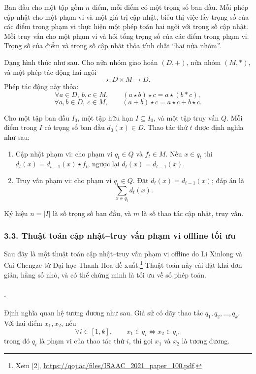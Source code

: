 \documentclass[11pt]{article}
\begin{document}
Ban đầu cho một tập gồm \(n\) điểm, mỗi điểm có một trọng số ban đầu. Mỗi phép
cập nhật cho một phạm vi và một giá trị cập nhật, biểu thị việc lấy trọng số
của các điểm trong phạm vi thực hiện một phép toán hai ngôi với trọng số cập
nhật. Mỗi truy vấn cho một phạm vi và hỏi tổng trọng số của các điểm trong phạm
vi. Trọng số của điểm và trọng số cập nhật thỏa tính chất ``hai nửa nhóm''.

Dạng hình thức như sau. Cho nửa nhóm giao hoán \((D,+)\), nửa nhóm \((M,*)\),
và một phép tác động hai ngôi
\[
  \star:D\times M\to D.
\]
Phép tác động này thỏa:
\[
  \forall a\in D,\ b,c\in M,\qquad (a\star b)\star c=a\star(b*c),
\]
\[
  \forall a,b\in D,\ c\in M,\qquad (a+b)\star c=a\star c+b\star c.
\]

Cho một tập ban đầu \(I_0\), một tập hữu hạn \(I\subseteq I_0\), và một tập
truy vấn \(Q\). Mỗi điểm trong \(I\) có trọng số ban đầu \(d_0(x)\in D\).
Thao tác thứ \(t\) được định nghĩa như sau:
\begin{enumerate}
  \item Cập nhật phạm vi: cho phạm vi \(q_t\in Q\) và \(f_t\in M\). Nếu
  \(x\in q_t\) thì \(d_t(x)=d_{t-1}(x)\star f_t\), ngược lại
  \(d_t(x)=d_{t-1}(x)\).
  \item Truy vấn phạm vi: cho phạm vi \(q_t\in Q\). Đặt
  \(d_t(x)=d_{t-1}(x)\); đáp án là
  \[
    \sum_{x\in q_t} d_t(x).
  \]
\end{enumerate}
Ký hiệu \(n=|I|\) là số trọng số ban đầu, và \(m\) là số thao tác cập nhật,
truy vấn.

\subsubsection*{3.3. Thuật toán cập nhật--truy vấn phạm vi offline tối ưu}

Sau đây là một thuật toán cập nhật--truy vấn phạm vi offline do Li Xinlong và
Cai Chengze từ Đại học Thanh Hoa đề xuất.\footnote{Xem [2],
\url{https://qoj.ac/files/ISAAC_2021_paper_100.pdf}.} Thuật toán này cài đặt
khá đơn giản, hằng số nhỏ, và có thể chứng minh là tối ưu về số phép toán.

\paragraph{.}
Định nghĩa quan hệ tương đương như sau. Giả sử có dãy thao tác
\(q_1,q_2,\ldots,q_k\). Với hai điểm \(x_1,x_2\), nếu
\[
  \forall i\in[1,k],\qquad x_1\in q_i \Longleftrightarrow x_2\in q_i,
\]
trong đó \(q_i\) là phạm vi của thao tác thứ \(i\), thì gọi \(x_1\) và \(x_2\)
là tương đương.
\end{document}
